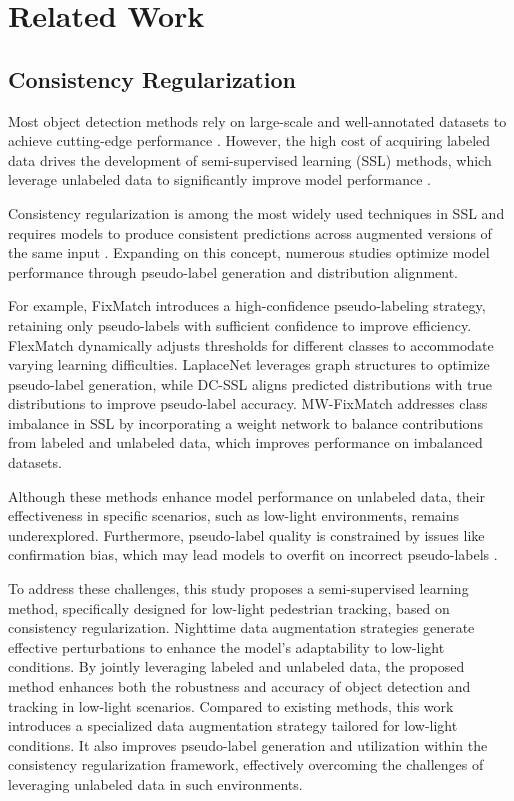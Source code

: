 \section{Related Work}
\subsection{Consistency Regularization}
Most object detection methods rely on large-scale and well-annotated datasets to achieve cutting-edge performance \cite{russakovsky2015imagenet,lin2014microsoft}. However, the high cost of acquiring labeled data drives the development of semi-supervised learning (SSL) methods, which leverage unlabeled data to significantly improve model performance \cite{berthelot2019remixmatch,sohn2020fixmatch,xie2020unsupervised,pham2021meta}.

Consistency regularization is among the most widely used techniques in SSL and requires models to produce consistent predictions across augmented versions of the same input \cite{bachman2014learning,sajjadi2016regularization}. Expanding on this concept, numerous studies optimize model performance through pseudo-label generation and distribution alignment.

For example, FixMatch \cite{sohn2020fixmatch} introduces a high-confidence pseudo-labeling strategy, retaining only pseudo-labels with sufficient confidence to improve efficiency. FlexMatch \cite{zhang2021flexmatch} dynamically adjusts thresholds for different classes to accommodate varying learning difficulties. LaplaceNet \cite{sellars2022laplacenet} leverages graph structures to optimize pseudo-label generation, while DC-SSL \cite{zhao2022dc} aligns predicted distributions with true distributions to improve pseudo-label accuracy. MW-FixMatch \cite{zheng2025mw} addresses class imbalance in SSL by incorporating a weight network to balance contributions from labeled and unlabeled data, which improves performance on imbalanced datasets.

Although these methods enhance model performance on unlabeled data, their effectiveness in specific scenarios, such as low-light environments, remains underexplored. Furthermore, pseudo-label quality is constrained by issues like confirmation bias, which may lead models to overfit on incorrect pseudo-labels \cite{wang2023conflict}.

To address these challenges, this study proposes a semi-supervised learning method, specifically designed for low-light pedestrian tracking, based on consistency regularization. Nighttime data augmentation strategies generate effective perturbations to enhance the model’s adaptability to low-light conditions. By jointly leveraging labeled and unlabeled data, the proposed method enhances both the robustness and accuracy of object detection and tracking in low-light scenarios. Compared to existing methods, this work introduces a specialized data augmentation strategy tailored for low-light conditions. It also improves pseudo-label generation and utilization within the consistency regularization framework, effectively overcoming the challenges of leveraging unlabeled data in such environments.

